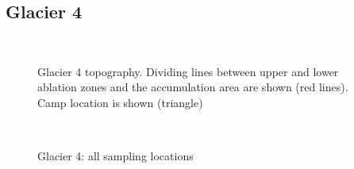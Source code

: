 \documentclass{sfuthesis}
\begin{document}
\begin{appendices}
\section*{Glacier 4}
	\begin{figure}[H]
	\centering
	\\
\caption[]{Glacier 4 topography. Dividing lines between upper and lower ablation zones and the accumulation area are shown (red lines). Camp location is shown (triangle) }
\end{figure}
	\begin{figure}[H]
	\centering
	\\
\caption[]{Glacier 4: all sampling locations}
\end{figure}

\end{appendices}
\end{document}
